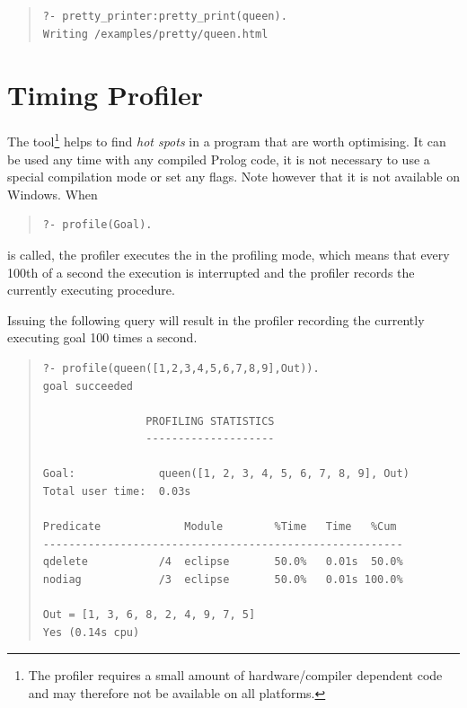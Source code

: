\begin{quote}
\begin{verbatim}
?- pretty_printer:pretty_print(queen).
Writing /examples/pretty/queen.html
\end{verbatim}
\end{quote}

\vfill %


\section{Timing Profiler}

The  tool\footnote{%
  The profiler requires a
  small amount of hardware/compiler dependent code and may therefore not
  be available on all platforms.}
helps to find \emph{hot spots} in
a program that are worth optimising. It can be used any time with any
compiled Prolog code, it is not necessary to use a special compilation
mode or set any flags.  Note however that it is not available on
Windows.  When
\begin{quote}
\begin{verbatim}
?- profile(Goal).
\end{verbatim}
\end{quote}
 is called, the profiler executes the  in
the profiling mode, which means that every 100th of a second the
execution is interrupted and the profiler records the currently
executing procedure.

Issuing the following query will result in the profiler recording the
currently executing goal 100 times a second.

\begin{quote}
\begin{verbatim}
?- profile(queen([1,2,3,4,5,6,7,8,9],Out)).
goal succeeded

                PROFILING STATISTICS
                --------------------

Goal:             queen([1, 2, 3, 4, 5, 6, 7, 8, 9], Out)
Total user time:  0.03s

Predicate             Module        %Time   Time   %Cum
--------------------------------------------------------
qdelete           /4  eclipse       50.0%   0.01s  50.0%
nodiag            /3  eclipse       50.0%   0.01s 100.0%

Out = [1, 3, 6, 8, 2, 4, 9, 7, 5]
Yes (0.14s cpu)
\end{verbatim}
\end{quote}

